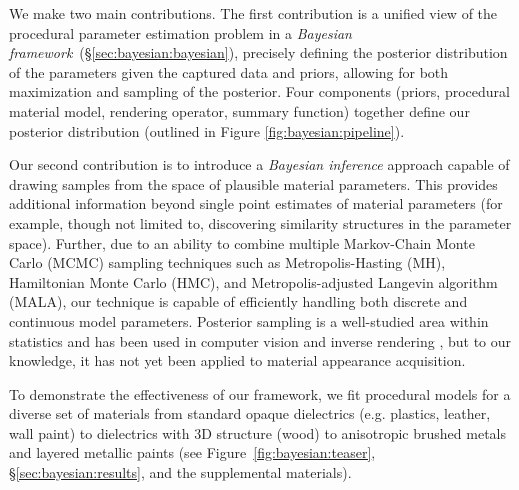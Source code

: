 We make two main contributions. The first contribution is a unified view of the procedural parameter estimation problem in a \emph{Bayesian framework}~(\S\ref{sec:bayesian:bayesian}), precisely defining the posterior distribution of the parameters given the captured data and priors, allowing for both maximization and sampling of the posterior. Four components (priors, procedural material model, rendering operator, summary function) together define our posterior distribution (outlined in Figure \ref{fig:bayesian:pipeline}). 



Our second contribution is to introduce a \emph{Bayesian inference} approach capable of drawing samples from the space of plausible material parameters.
This provides additional information beyond single point estimates of material parameters (for example, though not limited to, discovering similarity structures in the parameter space).
Further, due to an ability to combine multiple Markov-Chain Monte Carlo (MCMC) sampling techniques such as Metropolis-Hasting (MH), Hamiltonian Monte Carlo (HMC), and Metropolis-adjusted Langevin algorithm (MALA), our technique is capable of efficiently handling both discrete and continuous model parameters.
Posterior sampling is a well-studied area within statistics and has been used in computer vision and inverse rendering \cite{Picture}, but to our knowledge, it has not yet been applied to material appearance acquisition.

To demonstrate the effectiveness of our framework, we fit procedural models for a diverse set of materials from standard opaque dielectrics (e.g. plastics, leather, wall paint) to dielectrics with 3D structure (wood) to anisotropic brushed metals and layered metallic paints (see Figure~\ref{fig:bayesian:teaser}, \S\ref{sec:bayesian:results}, and the supplemental materials).

